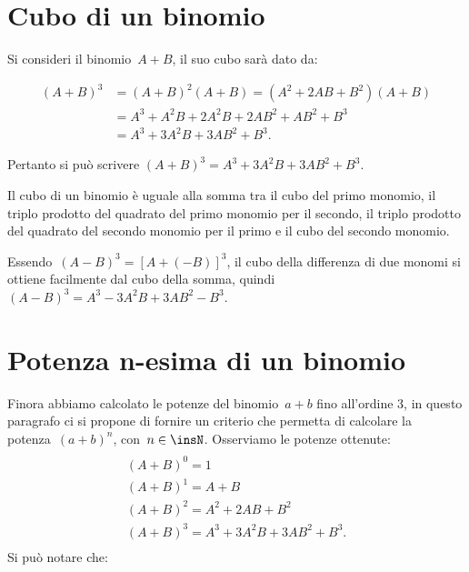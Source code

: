 \ovalbox{\risolvii \ref{ese:12.16}, \ref{ese:12.17}, \ref{ese:12.18}, \ref{ese:12.19}, \ref{ese:12.20}, \ref{ese:12.21}, \ref{ese:12.22}, \ref{ese:12.23}}

\section{Cubo di un binomio}\label{sect:cubo_di_un_binomio}

Si consideri il binomio~$A+B$, il suo cubo sarà dato da:

\begin{align*}
\left(A+B\right)^{3}&=\left(A+B\right)^{2}\left(A+B\right)=\left(A^{2}+2{AB}+B^{2}\right)\left(A+B\right)\\
&=A^{3}+A^{2}B+2A^{2}B+2{AB}^{2}+{AB}^{2}+B^{3}\\
&=A^{3}+3A^{2}B+3{AB}^{2}+B^{3}.
\end{align*}

Pertanto si può scrivere
$\left(A+B\right)^{3}=A^{3}+3A^{2}B+3{AB}^{2}+B^{3}$.

\osservazione Il cubo di un binomio è uguale alla somma tra il
cubo del primo monomio, il triplo prodotto del quadrato del primo
monomio per il secondo, il triplo prodotto del quadrato del secondo
monomio per il primo e il cubo del secondo monomio.

Essendo~$\left(A-B\right)^{3}=\left[A+\left(-B\right)\right]^{3}$, il
cubo della differenza di due monomi si ottiene facilmente dal cubo
della somma, quindi
$\left(A-B\right)^{3}=A^{3}-3A^{2}B+3{AB}^{2}-B^{3}$.

\vspazio\ovalbox{\risolvii \ref{ese:12.24}, \ref{ese:12.25}, \ref{ese:12.26}, \ref{ese:12.27}}

\section{Potenza n-esima di un binomio}

Finora abbiamo calcolato le potenze del binomio~$a+b$ fino
all'ordine 3, in questo paragrafo ci si propone di
fornire un criterio che permetta di calcolare la potenza~$(a+b)^{n}$,
con~$n\in \insN$. Osserviamo le potenze ottenute:
\begin{multline*}
\\(A+B)^{0}=1\\
(A+B)^{1}=A+B\\
(A+B)^{2}=A^{2}+2AB+B^{2}\\
(A+B)^{3}=A^{3}+3A^{2}B+3AB^{2}+B^{3}.\\
\end{multline*}
Si può notare che:


